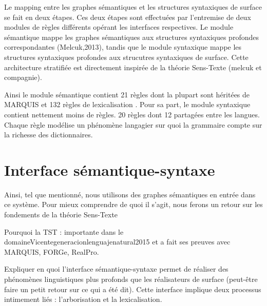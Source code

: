 Le mapping entre les graphes sémantiques et les structures syntaxiques de surface se fait en deux étapes. Ces deux étapes sont effectuées par l'entremise de deux modules de règles différents opérant les interfaces respectives. Le module sémantique mappe les graphes sémantiques aux structures syntaxiques profondes correspondantes (Melcuk,2013), tandis que le module syntaxique mappe les structures syntaxiques profondes aux strucutres syntaxiques de surface. Cette architecture stratifiée est directement inspirée de la théorie Sens-Texte (melcuk et compagnie).

Ainsi le module sémantique contient 21 règles dont la plupart sont héritées de MARQUIS et 132 règles de lexicalisation \citep{LambreyImplementationcollocationspour2017}. Pour sa part, le module syntaxique contient nettement moins de règles. 20 règles dont 12 partagées entre les langues. Chaque règle modélise un phénomène langagier sur quoi la grammaire compte sur la richesse des dictionnaires.


\section{Interface sémantique-syntaxe}

Ainsi, tel que mentionné, nous utilisons des graphes sémantiques en entrée dans ce système. Pour mieux comprendre de quoi il s'agit, nous ferons un retour sur les fondements de la théorie Sens-Texte

Pourquoi la TST : importante dans le domaine{Vicentegeneracionlenguajenatural2015} et a fait ses preuves avec MARQUIS, FORGe, RealPro.

Expliquer en quoi l'interface sémantique-syntaxe permet de réaliser des phénomènes linguistiques plus profonds que les réalisateurs de surface (peut-être faire un petit retour sur ce qui a été dit). Cette interface implique deux processus intimement liés : l'arborisation et la lexicalisation. 

